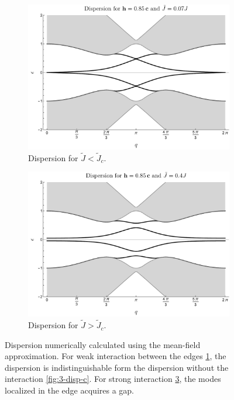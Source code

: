 \begin{figure}[ht]
    \centering
    \begin{subfigure}{.49\textwidth}
        \centering
        \includegraphics[width= \textwidth]{images/CH4/disp_MF_Gapless.pdf}
        \caption{Dispersion for  $\tilde{J}< \tilde{J}_c$.}
        \label{fig:4-MF-GL-disp}
    \end{subfigure}\hspace{1mm}%
    \begin{subfigure}{.49\textwidth}
        \centering
        \includegraphics[width= \textwidth]{images/CH4/disp_MF_Gapped.pdf}
        \caption{Dispersion for  $\tilde{J} > \tilde{J}_c$.}
        \label{fig:4-MF-GD-disp}
    \end{subfigure}
\caption{ Dispersion numerically calculated using the mean-field approximation. For weak interaction between the edges \ref{fig:4-MF-GL-disp}, the dispersion is indistinguishable form the dispersion without the interaction \ref{fig:3-disp-c}. For strong interaction \ref{fig:4-MF-GD-disp}, the modes localized in the edge acquires a gap.    }
\end{figure}




